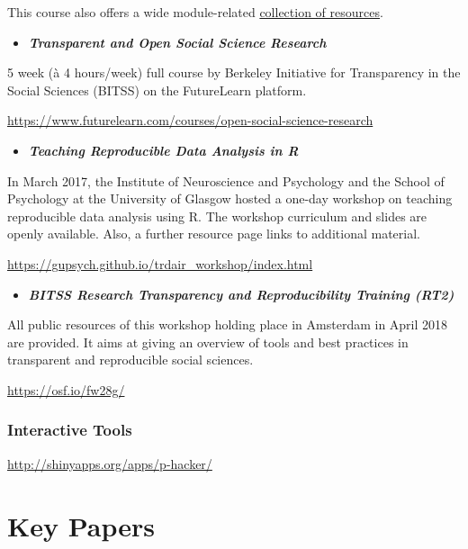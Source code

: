 \documentclass[12pt,]{report}
\providecommand{\tightlist}{%
  \setlength{\itemsep}{0pt}\setlength{\parskip}{0pt}}
\begin{document}
This course also offers a wide module-related
\href{https://opensciencemooc.eu/open-science-resources/}{collection of
resources}.

\begin{itemize}
\tightlist
\item
  \textbf{\emph{Transparent and Open Social Science Research}}
\end{itemize}

5 week (à 4 hours/week) full course by Berkeley Initiative for
Transparency in the Social Sciences (BITSS) on the FutureLearn platform.

\url{https://www.futurelearn.com/courses/open-social-science-research}

\begin{itemize}
\tightlist
\item
  \textbf{\emph{Teaching Reproducible Data Analysis in R}}
\end{itemize}

In March 2017, the Institute of Neuroscience and Psychology and the
School of Psychology at the University of Glasgow hosted a one-day
workshop on teaching reproducible data analysis using R. The workshop
curriculum and slides are openly available. Also, a further resource
page links to additional material.

\url{https://gupsych.github.io/trdair_workshop/index.html}

\begin{itemize}
\tightlist
\item
  \textbf{\emph{BITSS Research Transparency and Reproducibility Training
  (RT2)}}
\end{itemize}

All public resources of this workshop holding place in Amsterdam in
April 2018 are provided. It aims at giving an overview of tools and best
practices in transparent and reproducible social sciences.

\url{https://osf.io/fw28g/}

\subsection{Interactive Tools}\label{interactive-tools}

\href{https://gupsych.github.io/trdair_workshop/index.html}{http://shinyapps.org/apps/p-hacker/}

\hypertarget{key_papers}{\chapter{Key Papers}\label{key_papers}}
\end{document}
